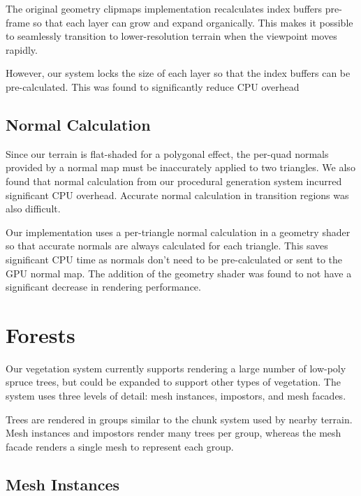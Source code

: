 The original geometry clipmaps implementation recalculates index buffers pre-frame so that each layer can grow and expand organically.
This makes it possible to seamlessly transition to lower-resolution terrain when the viewpoint moves rapidly.

However, our system locks the size of each layer so that the index buffers can be pre-calculated.
This was found to significantly reduce CPU overhead

\subsection{Normal Calculation}

Since our terrain is flat-shaded for a polygonal effect, the per-quad normals provided by a normal map must be inaccurately applied to two triangles.
We also found that normal calculation from our procedural generation system incurred significant CPU overhead.
Accurate normal calculation in transition regions was also difficult.

Our implementation uses a per-triangle normal calculation in a geometry shader so that accurate normals are always calculated for each triangle.
This saves significant CPU time as normals don't need to be pre-calculated or sent to the GPU normal map.
The addition of the geometry shader was found to not have a significant decrease in rendering performance.


\section{Forests} \label{forests} %

Our vegetation system currently supports rendering a large number of low-poly spruce trees, but could be expanded to support other types of vegetation.
The system uses three levels of detail: mesh instances, impostors, and mesh facades.

Trees are rendered in groups similar to the chunk system used by nearby terrain.
Mesh instances and impostors render many trees per group, whereas the mesh facade renders a single mesh to represent each group.

\subsection{Mesh Instances}

